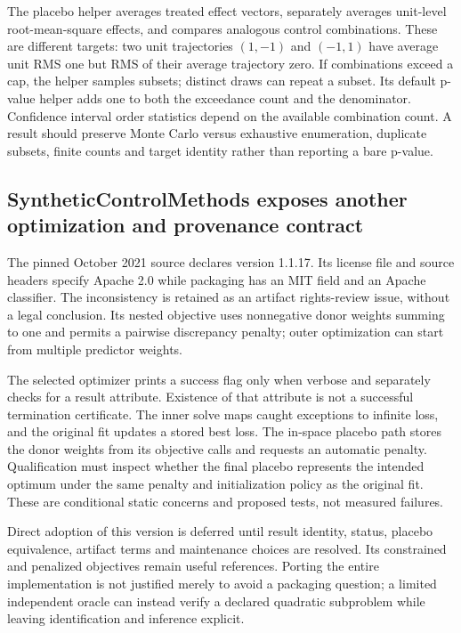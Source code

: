 The placebo helper averages treated effect vectors, separately averages
unit-level root-mean-square effects, and compares analogous control
combinations. These are different targets: two unit trajectories $(1,-1)$
and $(-1,1)$ have average unit RMS one but RMS of their average trajectory
zero. If combinations exceed a cap, the helper samples subsets; distinct
draws can repeat a subset. Its default p-value helper adds one to both
the exceedance count and the denominator. Confidence interval order
statistics depend on the available combination count. A result should
preserve Monte Carlo versus exhaustive enumeration, duplicate subsets,
finite counts and target identity rather than reporting a bare p-value.
\citep{exec25_synthpy_sparse,exec25_synthpy_choice}

\subsection{SyntheticControlMethods exposes another optimization and provenance contract}
The pinned October 2021 source declares version 1.1.17. Its license file
and source headers specify Apache 2.0 while packaging has an MIT field
and an Apache classifier. The inconsistency is retained as an artifact
rights-review issue, without a legal conclusion. Its nested objective
uses nonnegative donor weights summing to one and permits a pairwise
discrepancy penalty; outer optimization can start from multiple predictor
weights.\citep{exec25_synthpy_methods}

The selected optimizer prints a success flag only when verbose and separately
checks for a result attribute. Existence of that attribute is not a successful
termination certificate. The inner solve maps caught exceptions to infinite
loss, and the original fit updates a stored best loss. The in-space placebo
path stores the donor weights from its objective calls and requests an
automatic penalty. Qualification must inspect whether the final placebo
represents the intended optimum under the same penalty and initialization
policy as the original fit. These are conditional static concerns and
proposed tests, not measured failures.\citep{exec25_synthpy_methods}

Direct adoption of this version is deferred until result identity, status,
placebo equivalence, artifact terms and maintenance choices are resolved.
Its constrained and penalized objectives remain useful references. Porting
the entire implementation is not justified merely to avoid a packaging
question; a limited independent oracle can instead verify a declared
quadratic subproblem while leaving identification and inference explicit.
\citep{exec25_synthpy_choice}

